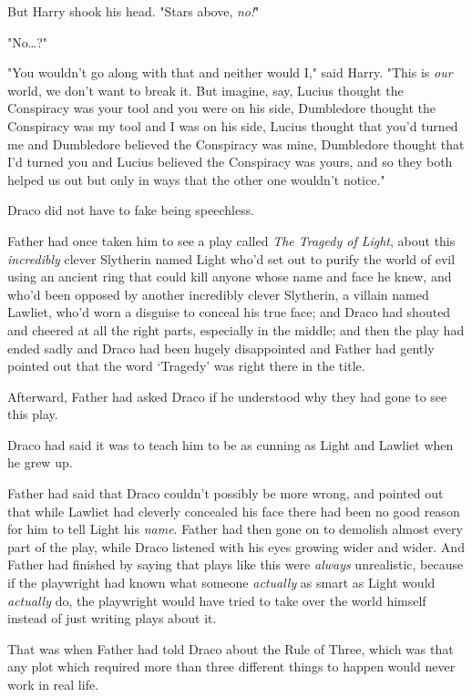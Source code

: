 But Harry shook his head. "Stars above, \emph{no!}"

"No{\ldots}?"

"You wouldn't go along with that and neither would I," said Harry. "This is 
\emph{our} world, we don't want to break it. But imagine, say, Lucius thought 
the Conspiracy was your tool and you were on his side, Dumbledore thought the 
Conspiracy was my tool and I was on his side, Lucius thought that you'd turned 
me and Dumbledore believed the Conspiracy was mine, Dumbledore thought that I'd 
turned you and Lucius believed the Conspiracy was yours, and so they both 
helped us out but only in ways that the other one wouldn't notice."

Draco did not have to fake being speechless.

Father had once taken him to see a play called \emph{The Tragedy of Light}, 
about this \emph{incredibly} clever Slytherin named Light who'd set out to 
purify the world of evil using an ancient ring that could kill anyone whose 
name and face he knew, and who'd been opposed by another incredibly clever 
Slytherin, a villain named Lawliet, who'd worn a disguise to conceal his true 
face; and Draco had shouted and cheered at all the right parts, especially in 
the middle; and then the play had ended sadly and Draco had been hugely 
disappointed and Father had gently pointed out that the word `Tragedy' was 
right there in the title.

Afterward, Father had asked Draco if he understood why they had gone to see 
this play.

Draco had said it was to teach him to be as cunning as Light and Lawliet when 
he grew up.

Father had said that Draco couldn't possibly be more wrong, and pointed out 
that while Lawliet had cleverly concealed his face there had been no good 
reason for him to tell Light his \emph{name}. Father had then gone on to 
demolish almost every part of the play, while Draco listened with his eyes 
growing wider and wider. And Father had finished by saying that plays like this 
were \emph{always} unrealistic, because if the playwright had known what 
someone \emph{actually} as smart as Light would \emph{actually} do, the 
playwright would have tried to take over the world himself instead of just 
writing plays about it.

That was when Father had told Draco about the Rule of Three, which was that any 
plot which required more than three different things to happen would never work 
in real life.

